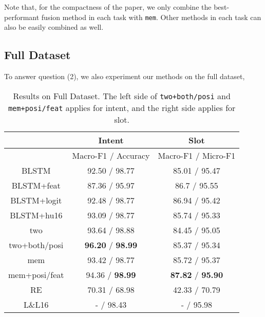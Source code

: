 Note that, for the compactness of the paper, we only combine the best-performant fusion method in each task with \texttt{mem}. Other methods in each task can also be easily combined as well. 



\subsection{Full Dataset}
To answer question (2), we also experiment our methods on the full dataset, 

\begin{table}
\setlength{\tabcolsep}{0.23em}
\centering
\small{
\begin{tabular}{|c|c|c|}

\hline
 & Intent & Slot \\ 
\hline
  & Macro-F1 / Accuracy &  Macro-F1 / Micro-F1 \\
\hline
BLSTM & 92.50 / 98.77  & 85.01 / 95.47\\
\hline
BLSTM+feat & 87.36 / 95.97 & 86.7 / 95.55\\
\hline
BLSTM+logit & 92.48 / 98.77 & 86.94 / 95.42  \\
\hline
BLSTM+hu16 & 93.09 / 98.77 & 85.74 / 95.33  \\
\hline
two & 93.64 / 98.88  & 84.45 / 95.05\\
\hline
two+both/posi & \textbf{96.20} / \textbf{98.99} & 85.37 / 95.34 \\
\hline
mem & 93.42 / 98.77 & 85.72 / 95.37\\
\hline
mem+posi/feat & 94.36 / \textbf{98.99} & \textbf{87.82} / \textbf{95.90} \\
\hline
\hline
RE & 70.31 / 68.98 & 42.33 / 70.79\\
\hline
L\&L16 & - / 98.43 & - / 95.98\\
\hline 

\end{tabular}
}
\caption{Results on Full Dataset. The left side of \texttt{two+both/posi} and \texttt{mem+posi/feat} applies for intent, and the right side applies for slot.} 
\label{tab_full}
\end{table}

